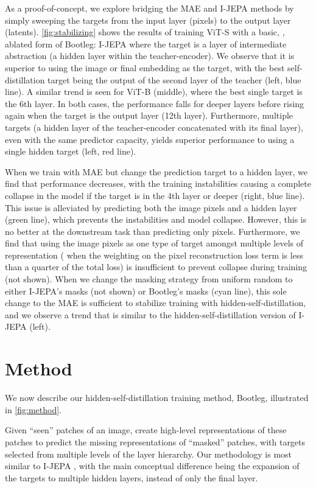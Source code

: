 As a proof-of-concept, we explore bridging the MAE and I-JEPA methods by simply sweeping the targets from the input layer (pixels) to the output layer (latents).
\cref{fig:stabilizing} shows the results of training ViT-S with a basic, \ie{}, ablated form of Bootleg: I-JEPA where the target is a layer of intermediate abstraction (a hidden layer within the teacher-encoder). We observe that it is superior to using the image or final embedding as the target, with the best self-distillation target being the output of the second layer of the teacher (left, blue line).
A similar trend is seen for ViT-B (middle), where the best single target is the 6th layer. %
In both cases, the performance falls for deeper layers before rising again when the target is the output layer (12th layer).
Furthermore, multiple targets (a hidden layer of the teacher-encoder concatenated with its final layer), even with the same predictor capacity, yields superior performance to using a single hidden target (left, red line).

When we train with MAE but change the prediction target to a hidden layer, we find that performance decreases, with the training instabilities causing a complete collapse in the model if the target is in the 4th layer or deeper (right, blue line).
This issue is alleviated by predicting both the image pixels and a hidden layer (green line), which prevents the instabilities and model collapse. However, this is no better at the downstream task than predicting only pixels.
Furthermore, we find that using the image pixels as one type of target amongst multiple levels of representation (\ie{} when the weighting on the pixel reconstruction loss term is less than a quarter of the total loss) is insufficient to prevent collapse during training (not shown).
When we change the masking strategy from uniform random to either I-JEPA's masks (not shown) or Bootleg's masks (cyan line), this sole change to the MAE is sufficient to stabilize training with hidden-self-distillation, and we observe a trend that is similar to the hidden-self-distillation version of I-JEPA (left).



\section{Method}
\label{s:method}

We now describe %
our hidden-self-distillation training method, Bootleg, illustrated in \cref{fig:method}.

 Given ``seen'' patches of an image, create high-level representations of these patches to predict the missing representations of ``masked'' patches, with targets selected from multiple levels of the layer hierarchy.
Our methodology is most similar to I-JEPA \citep{assran2023ijepa}, with the main conceptual difference being the expansion of the targets to multiple hidden layers, instead of only the final layer.

